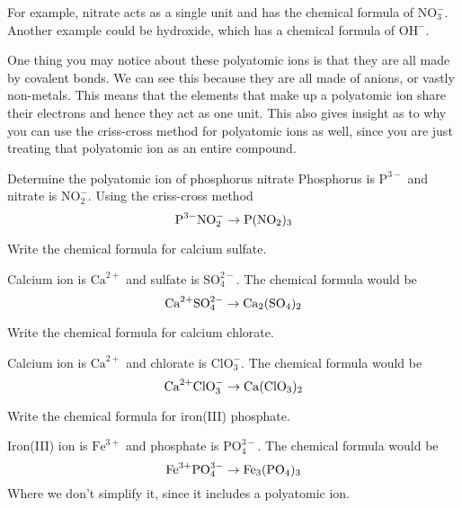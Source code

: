 \documentclass[12pt]{report}
\begin{document}
For example, nitrate acts as a single unit and has the chemical formula of $ \text{NO}^{-}_{3}$. Another example could be hydroxide, which has a chemical formula of $ \text{OH}^{-}.$\\

\begin{remark}{ } 
One thing you may notice about these polyatomic ions is that they are all made by covalent bonds. We can see this because they are all made of anions, or vastly non-metals. This means that the elements that make up a polyatomic ion share their electrons and hence they act as one unit. This also gives insight as to why you can use the criss-cross method for polyatomic ions as well, since you are just treating that polyatomic ion as an entire compound. 
\end{remark}

\begin{example}{Determine the polyatomic ion of phosphorus nitrate}
    Phosphorus is $\text{P}^{3-}$ and nitrate is $\text{NO}^{-}_{2}$. Using the criss-cross method 
    \[
        \text{P}^{3-} \text{NO}^{-}_{2}\to \ce{P} \ce{(NO2)3} 
    \]
\end{example}

\begin{problems}
    \item{Write the chemical formula for calcium sulfate.}
        \begin{solution}
            Calcium ion is $\text{Ca}^{2+}$ and sulfate is $\text{SO}^{2-}_{4}$. The chemical formula would be 
            \[
                \text{Ca}^{2+} \text{SO}^{2-}_{4}\to \ce{Ca2} \ce{(SO4)2}
            \]
        \end{solution}
    \item{Write the chemical formula for calcium chlorate.}
        \begin{solution}
            Calcium ion is $\text{Ca}^{2+}$ and chlorate is $\text{ClO}^{-}_{3}$. The chemical formula would be 
            \[
                \text{Ca}^{2+} \text{ClO}^{-}_{3}\to \ce{Ca(ClO3)2} 
            \]
        \end{solution}
    \item{Write the chemical formula for iron(III) phosphate.}
        \begin{solution}
            Iron(III) ion is $\text{Fe}^{3+}$ and phosphate is $\text{PO}^{3-}_{4}$. The chemical formula would be 
            \[
                \text{Fe}^{3+} \text{PO}^{3-}_{4}\to \ce{Fe3(PO4)3}
            \]
            Where we don't simplify it, since it includes a polyatomic ion. 
        \end{solution}
\end{problems}
\end{document}

